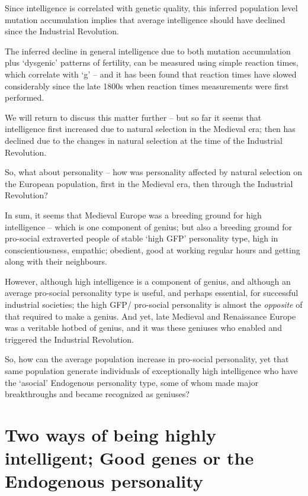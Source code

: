 \documentclass[
]{book}
\begin{document}
Since intelligence is correlated with genetic quality, this inferred population level mutation accumulation implies that average intelligence should have declined since the Industrial Revolution.

The inferred decline in general intelligence due to both mutation accumulation plus `dysgenic' patterns of fertility, can be measured using simple reaction times, which correlate with `g' -- and it has been found that reaction times have slowed considerably since the late 1800s when reaction times measurements were first performed.

We will return to discuss this matter further -- but so far it seems that intelligence first increased due to natural selection in the Medieval era; then has declined due to the changes in natural selection at the time of the Industrial Revolution.

So, what about personality -- how was personality affected by natural selection on the European population, first in the Medieval era, then through the Industrial Revolution?

In sum, it seems that Medieval Europe was a breeding ground for high intelligence -- which is one component of genius; but also a breeding ground for pro-social extraverted people of stable `high GFP' personality type, high in conscientiousness, empathic; obedient, good at working regular hours and getting along with their neighbours.

However, although high intelligence is a component of genius, and although an average pro-social personality type is useful, and perhaps essential, for successful industrial societies; the high GFP/ pro-social personality is almost the \emph{opposite} of that required to make a genius. And yet, late Medieval and Renaissance Europe was a veritable hotbed of genius, and it was these geniuses who enabled and triggered the Industrial Revolution.

So, how can the average population increase in pro-social personality, yet that same population generate individuals of exceptionally high intelligence who have the `asocial' Endogenous personality type, some of whom made major breakthroughs and became recognized as geniuses?

\hypertarget{two-ways-of-being-highly-intelligent-good-genes-or-the-endogenous-personality}{%
\section{Two ways of being highly intelligent; Good genes or the Endogenous personality}\label{two-ways-of-being-highly-intelligent-good-genes-or-the-endogenous-personality}}
\end{document}
